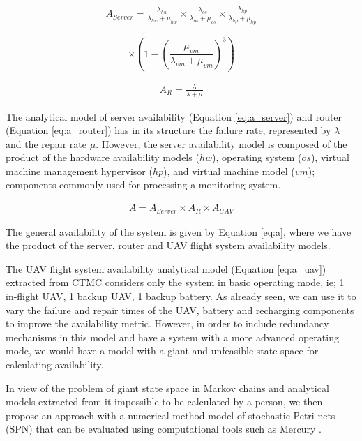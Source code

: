 \documentclass[conference]{IEEEtran}
\begin{document}
\begin{align}\label{eq:a_server}
A_{Server} = \frac{\lambda_{hw}}{\lambda_{hw} + \mu_{hw}} \times \frac{\lambda_{os}}{\lambda_{os} + \mu_{os}} \times
\frac{\lambda_{hp}}{\lambda_{hp} + \mu_{hp}} 
\end{align}

\[\times(1- (\frac{\mu_{vm}}{\lambda_{vm} + \mu_{vm}})^{3})\]

\begin{align}\label{eq:a_router}
A_{R} = \frac{\lambda}{\lambda + \mu} 
\end{align}

The analytical model of server availability (Equation \ref{eq:a_server}) and router (Equation \ref{eq:a_router}) has in its structure the failure rate, represented by $\lambda$ and the repair rate $\mu $. However, the server availability model is composed of the product of the hardware availability models ($hw$), operating system ($os$), virtual machine management hypervisor ($hp$), and virtual machine model ($ vm$); components commonly used for processing a monitoring system.

\begin{align}\label{eq:a}
A = A_{Server} \times A_{R}  \times A_{UAV}
\end{align}

The general availability of the system is given by Equation \ref{eq:a}, where we have the product of the server, router and UAV flight system availability models.

The UAV flight system availability analytical model (Equation \ref{eq:a_uav}) extracted from CTMC considers only the system in basic operating mode, ie; 1 in-flight UAV, 1 backup UAV, 1 backup battery. As already seen, we can use it to vary the failure and repair times of the UAV, battery and recharging components to improve the availability metric. However, in order to include redundancy mechanisms in this model and have a system with a more advanced operating mode, we would have a model with a giant and unfeasible state space for calculating availability.

In view of the problem of giant state space in Markov chains and analytical models extracted from it impossible to be calculated by a person, we then propose an approach with a numerical method model of stochastic Petri nets (SPN) that can be evaluated using computational tools such as Mercury \cite{maciel2017mercury}.
\end{document}
